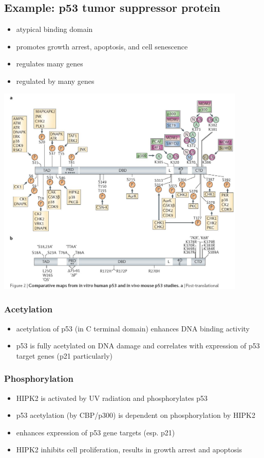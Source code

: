 \documentclass[10pt]{article}
\newenvironment{mitemize}
{
  \begin{itemize}
  \setlength{\itemsep}{1pt}
  \setlength{\parskip}{0pt}
  \setlength{\parsep}{0pt}}{\end{itemize}
}
\begin{document}
\subsection*{Example: p53 tumor suppressor protein}
\begin{mitemize}
  \item atypical binding domain
  \item promotes growth arrest, apoptosis, and cell senescence
  \item regulates many genes
  \item regulated by many genes
\end{mitemize}
\vspace{25px}

\begin{center}
  \includegraphics[width=450px]{p53mods.jpg}
\end{center}

\subsubsection*{Acetylation}
\begin{itemize}
  \item acetylation of p53 (in C terminal domain) enhances DNA binding activity
  \item p53 is fully acetylated on DNA damage and correlates with expression of p53 target genes (p21 particularly)
\end{itemize}

\subsubsection*{Phosphorylation}
\begin{itemize}
  \item HIPK2 is activated by UV radiation and phosphorylates p53
  \item p53 acetylation (by CBP/p300) is dependent on phosphorylation by HIPK2
  \item enhances expression of p53 gene targets (esp. p21)
  \item HIPK2 inhibits cell proliferation, results in growth arrest and apoptosis
\end{itemize}
\end{document}
